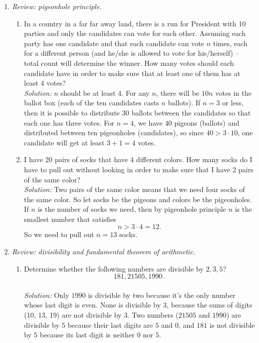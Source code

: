 \documentclass[12pt]{amsart}
\begin{document}
\begin{enumerate}[label=\arabic*.,itemsep=10pt, leftmargin=*]
\item
    \textit{Review: pigeonhole principle.}
    \begin{enumerate}
        \item In a country in a far far away land, there is a run for President with 10 parties and only the candidates can vote for each other.
        Assuming each party has one candidate
        and that each candidate can vote $n$ times, each for a different person (and he/she is allowed to vote for his/herself) -- total count will determine the winner.
        How many votes should each candidate have in order to make sure that at least one of them has at least 4 votes?
    \\ \textit{Solution:} $n$ should be at least $4$. 
    For any $n$, there will be $10n$ votes in the ballot box (each of the ten candidates casts $n$ ballots).
    If $n=3$ or less, then it is possible to distribute $30$ ballots between the candidates so that each one has three votes. For $n=4$, we have $40$ pigeons (ballots) and distributed between ten pigeonholes (candidates), so since $40 > 3 \cdot 10$, one candidate will get at least $3+1=4$ votes. 
        
        \item I have 20 pairs of socks that have 4 different colors.
        How many socks do I have to pull out without looking in order to make sure that I have 2 pairs of the same color?
    \\ \textit{Solution:} Two pairs of the same color means that we need four socks of the same color. So let socks be the pigeons and colors be the pigeonholes. If $n$ is the number of socks we need, then by pigeonhole principle $n$ is the smallest number that satisfies
    $$ n > 3\cdot 4 = 12 
    .$$
    So we need to pull out $n=13$ socks.
    \end{enumerate} 
    



\item
    \textit{Review: divisibility and fundamental theorem of arithmetic.}
    \begin{enumerate}
        \item Determine whether the following numbers are divisible by $2,3,5$?
        \begin{equation*}
            181, 21505, 1990 \,.
        \end{equation*}
    \\ \textit{Solution:} Only $1990$ is divisible by two because it's the only number whose last digit is even. None is divisible by $3$, because the sums of digits (10, 13, 19) are not divisible by $3$. Two numbers ($21505$ and $1990$) are divisible by $5$ because their last digits are $5$ and $0$, and $181$ is not divisible by $5$ because its last digit is neither $0$ nor $5$.
        

\end{enumerate}
\end{enumerate}
\end{document}
